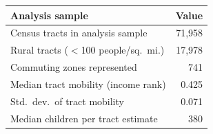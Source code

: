 \begin{tabular}{lr}
\toprule
Analysis sample & Value \\
\midrule
Census tracts in analysis sample & 71,958 \\
Rural tracts ($<$100 people/sq.\ mi.) & 17,978 \\
Commuting zones represented & 741 \\
Median tract mobility (income rank) & 0.425 \\
Std.\ dev.\ of tract mobility & 0.071 \\
Median children per tract estimate & 380 \\
\bottomrule
\end{tabular}
